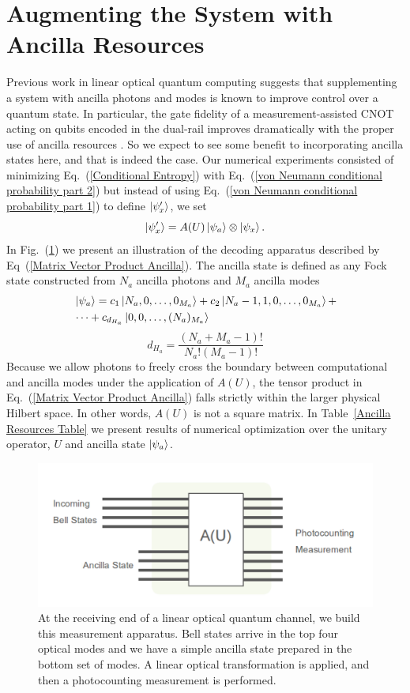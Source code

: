 \documentclass[aps,pra,twocolumn,showpacs,superscriptaddress,floatfix,10pt]{revtex4}
\begin{document}
\section{Augmenting the System with Ancilla Resources}
\label{Augmenting Section}
Previous work in linear optical quantum computing suggests that supplementing a system with ancilla photons and modes is known to improve control over a quantum state. In particular, the gate fidelity of a measurement-assisted CNOT~\cite{KLM} acting on qubits encoded in the dual-rail improves dramatically with the proper use of ancilla resources \cite{Uskov}. So we expect to see some benefit to incorporating ancilla states here, and that is indeed the case. Our numerical experiments consisted of minimizing Eq.~(\ref{Conditional Entropy}) with Eq.~(\ref{von Neumann conditional probability part 2}) but instead of using Eq.~(\ref{von Neumann conditional probability part 1}) to define $\ket{\psi_x^\prime}$, we set
\begin{equation}
\label{Matrix Vector Product Ancilla}
\ket{\psi_x^\prime} = A(U) \ket{\psi_a} \otimes \ket{\psi_x}.
\end{equation}
In  Fig.~(\ref{Decoding Hardware Ancillas}) we present an illustration of the decoding apparatus described by Eq~(\ref{Matrix Vector Product Ancilla}). The ancilla state is defined as any Fock state constructed from $N_a$ ancilla photons and $M_a$ ancilla modes 
\begin{eqnarray}
& \ket{\psi_a} = c_1 \ket{N_a,0,\dots,0_{M_a}} + c_2 \ket{N_a-1,1,0,\dots, 0_{M_a}} + \nonumber \\ & \dots  + c_{d_{H_a}} \ket{0,0,\dots,(N_a)_{M_a}}	 \quad \quad \quad \quad
\end{eqnarray}
\begin{equation}
d_{H_a} = \frac{(N_a+M_a-1)!}{N_a ! (M_a-1)!}
\end{equation}
Because we allow photons to freely cross the boundary between computational and ancilla modes under the application of $A(U)$, the tensor product in Eq.~(\ref{Matrix Vector Product Ancilla}) falls strictly within the larger physical Hilbert space. In other words, $A(U)$ is not a square matrix. In Table~\ref{Ancilla Resources Table} we present results of numerical optimization over the unitary operator, $U$ and ancilla state $\ket{\psi_a}$.
\begin{figure}[ht]
	\centering
	\includegraphics[width= 0.5 \textwidth]{./ancillaMeasApp.pdf}
	\caption{At the receiving end of a linear optical quantum channel, we build this measurement apparatus. Bell states arrive in the top four optical modes and we have a simple ancilla state prepared in the bottom set of modes. A linear optical transformation is applied, and then a photocounting measurement is performed.}
	\label{Decoding Hardware Ancillas}
\end{figure}
\end{document}
